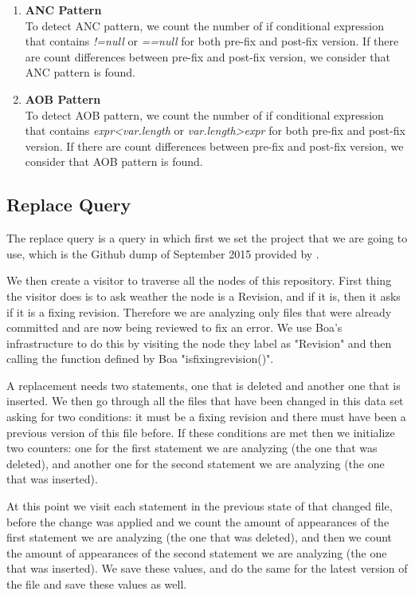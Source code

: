 \documentclass{sig-alternate-05-2015}
\begin{document}
\begin{enumerate}
\item {\bf ANC Pattern}\\
  To detect ANC pattern, we count the number of if conditional expression that
  contains {\em !=null} or {\em ==null} for both pre-fix and post-fix
  version. If there are count differences between pre-fix and post-fix version,
  we consider that ANC pattern is found.
	
\item {\bf AOB Pattern}\\
  To detect AOB pattern, we count the number of if conditional expression that
  contains {\em expr<var.length} or {\em var.length>expr} for both pre-fix and
  post-fix version. If there are count differences between pre-fix and post-fix
  version, we consider that AOB pattern is found.
	
\end{enumerate}

\subsection{Replace Query}
The replace query is a query in which first we set the project that we are going
to use, which is the Github dump of September 2015 provided by \cite{robert}.

We then create a visitor to traverse all the nodes of this repository. First
thing the visitor does is to ask weather the node is a Revision, and if it is,
then it asks if it is a fixing revision. Therefore we are analyzing only files
that were already committed and are now being reviewed to fix an error. We use
Boa's infrastructure to do this by visiting the node they label as "Revision"
and then calling the function defined by Boa "isfixingrevision()".

A replacement needs two statements, one that is deleted and another one that is
inserted.  We then go through all the files that have been changed in this data
set asking for two conditions: it must be a fixing revision and there must have
been a previous version of this file before. If these conditions are met then we
initialize two counters: one for the first statement we are analyzing (the one
that was deleted), and another one for the second statement we are analyzing
(the one that was inserted).

At this point we visit each statement in the previous state of that changed
file, before the change was applied and we count the amount of appearances of
the first statement we are analyzing (the one that was deleted), and then we
count the amount of appearances of the second statement we are analyzing (the
one that was inserted). We save these values, and do the same for the latest
version of the file and save these values as well.
\end{document}

